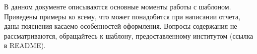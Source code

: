 \introduction %

В данном документе описываются основные моменты работы с шаблоном. Приведены примеры ко всему, что может понадобится при написании отчета, даны пояснения касаемо особенностей оформления. Вопросы содержания не рассматриваются, обращайтесь к шаблону, предоставленному институтом (ссылка в README).
